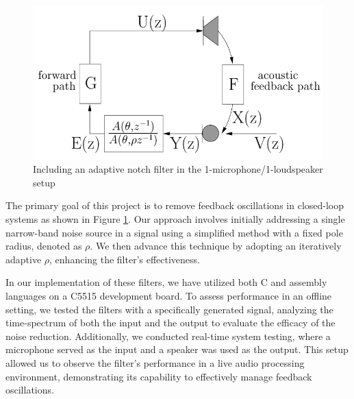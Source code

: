\begin{figure}[ht]
    \centering
    \includegraphics[width=0.8\columnwidth]{images/system_digram_anf.png}
    \caption{Including an adaptive notch filter in the 1-microphone/1-loudspeaker
setup\cite{7077829}}
    \label{fig:system_diagram_anf}
\end{figure}

The primary goal of this project is to remove feedback oscillations in closed-loop systems as shown in Figure \ref{fig:system_diagram_anf}. Our approach involves initially addressing a single narrow-band noise source in a signal using a simplified method with a fixed pole radius, denoted as $\rho$. We then advance this technique by adopting an iteratively adaptive $\rho$, enhancing the filter's effectiveness. 

In our implementation of these filters, we have utilized both C and assembly languages on a C5515 development board. To assess performance in an offline setting, we tested the filters with a specifically generated signal, analyzing the time-spectrum of both the input and the output to evaluate the efficacy of the noise reduction. Additionally, we conducted real-time system testing, where a microphone served as the input and a speaker was used as the output. This setup allowed us to observe the filter's performance in a live audio processing environment, demonstrating its capability to effectively manage feedback oscillations.


